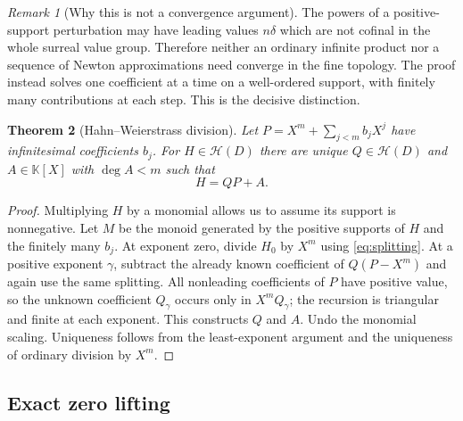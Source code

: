 \documentclass[11pt,letterpaper]{article}
\numberwithin{equation}{section}
\newtheorem{theorem}{Theorem}[section]
\theoremstyle{definition}
\theoremstyle{remark}
\newtheorem{remark}[theorem]{Remark}
\newcommand{\K}{\mathbb{K}}
\newcommand{\HH}{\mathcal{H}}
\begin{document}
\begin{remark}[Why this is not a convergence argument]
The powers of a positive-support perturbation may have leading values
$n\delta$ which are not cofinal in the whole surreal value group. Therefore
neither an ordinary infinite product nor a sequence of Newton approximations
need converge in the fine topology. The proof instead solves one coefficient
at a time on a well-ordered support, with finitely many contributions at each
step. This is the decisive distinction.
\end{remark}

\begin{theorem}[Hahn--Weierstrass division]\label{thm:division}
Let $P=X^m+\sum_{j<m}b_jX^j$ have infinitesimal coefficients $b_j$. For
$H\in\HH(D)$ there are unique $Q\in\HH(D)$ and $A\in\K[X]$ with
$\deg A<m$ such that
\begin{equation}\label{eq:division}
 H=QP+A.
\end{equation}
\end{theorem}
\begin{proof}
Multiplying $H$ by a monomial allows us to assume its support is nonnegative.
Let $M$ be the monoid generated by the positive supports of $H$ and the
finitely many $b_j$. At exponent zero, divide $H_0$ by $X^m$ using
\eqref{eq:splitting}. At a positive exponent $\gamma$, subtract the already
known coefficient of $Q(P-X^m)$ and again use the same splitting. All
nonleading coefficients of $P$ have positive value, so the unknown
coefficient $Q_\gamma$ occurs only in $X^mQ_\gamma$; the recursion is
triangular and finite at each exponent. This constructs $Q$ and $A$.
Undo the monomial scaling. Uniqueness follows from the least-exponent
argument and the uniqueness of ordinary division by $X^m$.
\end{proof}

\subsection{Exact zero lifting}
\end{document}
